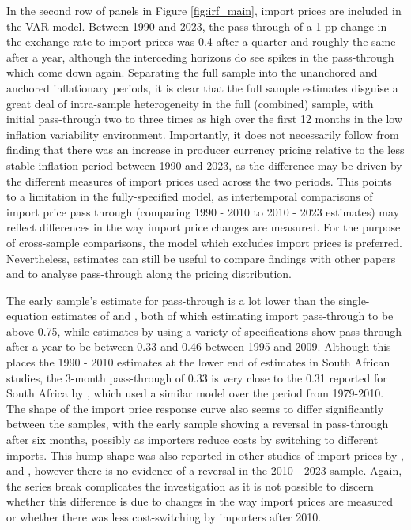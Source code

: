\documentclass[12pt]{article}
\begin{document}
In the second row of panels in Figure \ref{fig:irf_main}, import prices are included in the VAR model. Between 1990 and 2023, the pass-through of a 1 pp change in the exchange rate to import prices was 0.4 after a quarter and roughly the same after a year, although the interceding horizons do see spikes in the pass-through which come down again. Separating the full sample into the unanchored and anchored inflationary periods, it is clear that the full sample estimates disguise a great deal of intra-sample heterogeneity in the full (combined) sample, with initial pass-through two to three times as high over the first 12 months in the low inflation variability environment. Importantly, it does not necessarily follow from finding  that there was an increase in producer currency pricing relative to the less stable inflation period between 1990 and 2023, as the difference may be driven by the different measures of import prices used across the two periods. This points to a limitation in the fully-specified model, as intertemporal comparisons of import price pass through (comparing 1990 - 2010 to 2010 - 2023 estimates) may reflect differences in the way import price changes are measured. For the purpose of cross-sample comparisons, the model which excludes import prices is preferred. Nevertheless, estimates can still be useful to compare findings with other papers and to analyse pass-through along the pricing distribution. 

The early sample's estimate for pass-through is a lot lower than the single-equation estimates of \textcite{Karoroetal2008} and \textcite{kabundi2016exchange}, both of which estimating import pass-through to be above 0.75, while estimates by \textcite{aronetal2012} using a variety of specifications show pass-through after a year to be between 0.33 and 0.46 between 1995 and 2009. Although this places the 1990 - 2010 estimates at the lower end of estimates in South African studies, the 3-month pass-through of 0.33 is very close to the 0.31 reported for South Africa by \textcite{choudhri2015exchange}, which used a similar model over the period from 1979-2010. The shape of the import price response curve also seems to differ significantly between the samples, with the early sample showing a reversal in pass-through after six months, possibly as importers reduce costs by switching to different imports. This hump-shape was also reported in other studies of import prices by \textcite{mccarthy1999}, \textcite{hahn2003} and \textcite{AnWang2011}, however there is no evidence of a reversal in the 2010 - 2023 sample. Again, the series break complicates the investigation as it is not possible to discern whether this difference is due to changes in the way import prices are measured or whether there was less cost-switching by importers after 2010. 
\end{document}
